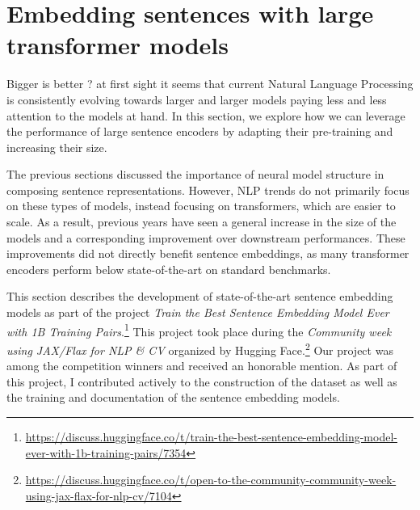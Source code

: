 \setchapterpreamble[u]{\margintoc}
\chapter{Embedding sentences with large transformer models}



Bigger is better ? at first sight it seems that current Natural Language Processing is consistently evolving towards larger and larger models paying less and less attention to the models at hand. In this section, we explore how we can leverage the performance of large sentence encoders by adapting their pre-training and increasing their size.

The previous sections discussed the importance of neural model structure in composing sentence representations. However, NLP trends do not primarily focus on these types of models, instead focusing on transformers, which are easier to scale. As a result, previous years have seen a general increase in the size of the models and a corresponding improvement over downstream performances. These improvements did not directly benefit sentence embeddings, as many transformer encoders perform below state-of-the-art on standard benchmarks. 

This section describes the development of state-of-the-art sentence embedding models as part of the project \textit{Train the Best Sentence Embedding Model Ever with 1B Training Pairs}.\footnote{\url{https://discuss.huggingface.co/t/train-the-best-sentence-embedding-model-ever-with-1b-training-pairs/7354}} This project took place during the \textit{Community week using JAX/Flax for NLP \& CV} organized by Hugging Face.\footnote{\url{https://discuss.huggingface.co/t/open-to-the-community-community-week-using-jax-flax-for-nlp-cv/7104}} Our project was among the competition winners and received an honorable mention. As part of this project, I contributed actively to the construction of the dataset as well as the training and documentation of the sentence embedding models.

